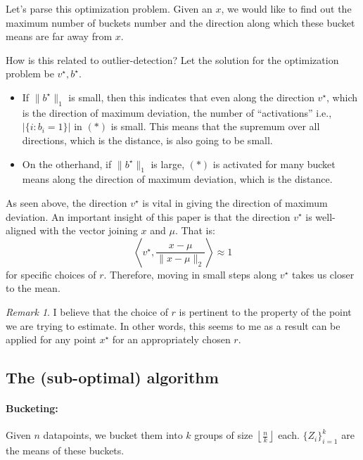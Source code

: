 \documentclass{article}
\theoremstyle{remark}
\newtheorem*{remark}{Remark}
\theoremstyle{defintiion}
\newcommand{\inner}[2]{\left\langle #1, #2 \right\rangle}
\begin{document}
Let's parse this optimization problem. Given an \(x\), we would like to find out the maximum number of buckets number and the direction along which these bucket means are far away from \(x\).

How is this related to outlier-detection? Let the solution for the optimization problem be \(v^{\star}, b^{\star}\).
\begin{itemize}
\item If \(\|b^{\star}\|_{1}\) is small, then this indicates that even along the direction \(v^{\star}\), which is the direction of maximum deviation, the number of ``activations'' i.e., \(\left|\{i : b_{i} = 1\}\right|\) in \((*)\) is small. This means that the supremum over all directions, which is the distance, is also going to be small.
\item On the otherhand, if \(\|b^{\star}\|_{1}\) is large, \((*)\) is activated for many bucket means along the direction of maximum deviation, which is the distance.
\end{itemize}

As seen above, the direction \(v^{\star}\) is vital in giving the direction of maximum deviation. An important insight of this paper is that the direction \(v^{\star}\) is well-aligned with the vector joining \(x\) and \(\mu\). That is:
\begin{equation*}
\inner{v^{\star}}{\frac{x - \mu}{\|x - \mu\|_{2}}} \approx 1
\end{equation*}
for specific choices of \(r\). Therefore, moving in small steps along \(v^{\star}\) takes us closer to the mean.

\begin{remark}
I believe that the choice of \(r\) is pertinent to the property of the point we are trying to estimate. In other words, this seems to me as a result can be applied for any point \(x^{\star}\) for an appropriately chosen \(r\).
\end{remark}

\subsection{The (sub-optimal) algorithm}

\paragraph{Bucketing:} Given \(n\) datapoints, we bucket them into \(k\) groups of size \(\left\lfloor \frac{n}{k} \right\rfloor\) each. \(\{Z_{i}\}_{i=1}^{k}\) are the means of these buckets.
\end{document}
